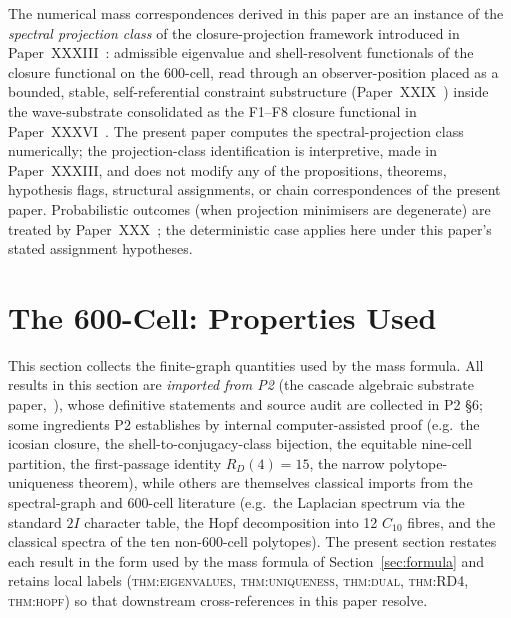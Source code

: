 \documentclass[12pt]{article}
\begin{document}
The numerical mass correspondences derived in this paper are an instance of the \textit{spectral projection class} of the closure-projection framework introduced in Paper~XXXIII~\citep{SmartXXXIII}: admissible eigenvalue and shell-resolvent functionals of the closure functional on the 600-cell, read through an observer-position placed as a bounded, stable, self-referential constraint substructure (Paper~XXIX~\citep{SmartXXIX}) inside the wave-substrate consolidated as the F1--F8 closure functional in Paper~XXXVI~\citep{SmartXXXVI}. The present paper computes the spectral-projection class numerically; the projection-class identification is interpretive, made in Paper~XXXIII, and does not modify any of the propositions, theorems, hypothesis flags, structural assignments, or chain correspondences of the present paper. Probabilistic outcomes (when projection minimisers are degenerate) are treated by Paper~XXX~\citep{SmartXXX}; the deterministic case applies here under this paper's stated assignment hypotheses.

\section{The 600-Cell: Properties Used}\label{sec:600cell}

This section collects the finite-graph quantities used by the mass formula. All results in this section are \emph{imported from P2} (the cascade algebraic substrate paper,~\citep{CascadeAlgSubstrate}), whose definitive statements and source audit are collected in P2 \S 6; some ingredients P2 establishes by internal computer-assisted proof (e.g.\ the icosian closure, the shell-to-conjugacy-class bijection, the equitable nine-cell partition, the first-passage identity $R_D(4) = 15$, the narrow polytope-uniqueness theorem), while others are themselves classical imports from the spectral-graph and $600$-cell literature (e.g.\ the Laplacian spectrum via the standard $2I$ character table, the Hopf decomposition into 12 $C_{10}$ fibres, and the classical spectra of the ten non-$600$-cell polytopes). The present section restates each result in the form used by the mass formula of Section~\ref{sec:formula} and retains local labels (\textsc{thm:eigenvalues}, \textsc{thm:uniqueness}, \textsc{thm:dual}, \textsc{thm:RD4}, \textsc{thm:hopf}) so that downstream cross-references in this paper resolve.
\end{document}
